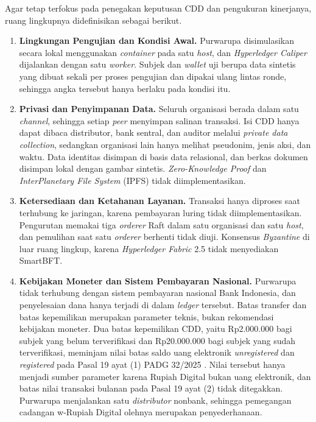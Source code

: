 Agar tetap terfokus pada penegakan keputusan CDD dan pengukuran kinerjanya, ruang lingkupnya didefinisikan sebagai berikut.
\begin{enumerate}
	\item \textbf{Lingkungan Pengujian dan Kondisi Awal.} Purwarupa disimulasikan secara lokal menggunakan \textit{container} pada satu \textit{host}, dan \textit{Hyperledger Caliper} dijalankan dengan satu \textit{worker}. Subjek dan \textit{wallet} uji berupa data sintetis yang dibuat sekali per proses pengujian dan dipakai ulang lintas ronde, sehingga angka tersebut hanya berlaku pada kondisi itu.
	\item \textbf{Privasi dan Penyimpanan Data.} Seluruh organisasi berada dalam satu \textit{channel}, sehingga setiap \textit{peer} menyimpan salinan transaksi. Isi CDD hanya dapat dibaca distributor, bank sentral, dan auditor melalui \textit{private data collection}, sedangkan organisasi lain hanya melihat pseudonim, jenis aksi, dan waktu. Data identitas disimpan di basis data relasional, dan berkas dokumen disimpan lokal dengan gambar sintetis. \textit{Zero-Knowledge Proof} dan \textit{InterPlanetary File System} (IPFS) tidak diimplementasikan.
	\item \textbf{Ketersediaan dan Ketahanan Layanan.} Transaksi hanya diproses saat terhubung ke jaringan, karena pembayaran luring tidak diimplementasikan. Pengurutan memakai tiga \textit{orderer} Raft dalam satu organisasi dan satu \textit{host}, dan pemulihan saat satu \textit{orderer} berhenti tidak diuji. Konsensus \textit{Byzantine} di luar ruang lingkup, karena \textit{Hyperledger Fabric} 2.5 tidak menyediakan SmartBFT.
	\item \textbf{Kebijakan Moneter dan Sistem Pembayaran Nasional.} Purwarupa tidak terhubung dengan sistem pembayaran nasional Bank Indonesia, dan penyelesaian dana hanya terjadi di dalam \textit{ledger} tersebut. Batas transfer dan batas kepemilikan merupakan parameter teknis, bukan rekomendasi kebijakan moneter. Dua batas kepemilikan CDD, yaitu Rp2.000.000 bagi subjek yang belum terverifikasi dan Rp20.000.000 bagi subjek yang sudah terverifikasi, meminjam nilai batas saldo uang elektronik \textit{unregistered} dan \textit{registered} pada Pasal 19 ayat (1) PADG 32/2025 \cite{bi2025padg32}. Nilai tersebut hanya menjadi sumber parameter karena Rupiah Digital bukan uang elektronik, dan batas nilai transaksi bulanan pada Pasal 19 ayat (2) tidak ditegakkan. Purwarupa menjalankan satu \textit{distributor} nonbank, sehingga pemegangan cadangan w-Rupiah Digital olehnya merupakan penyederhanaan.

\end{enumerate}
